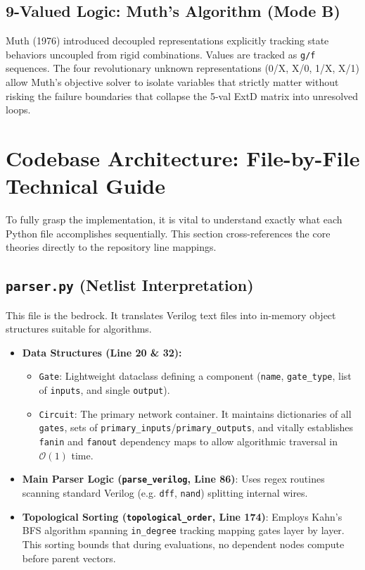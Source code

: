 \documentclass[12pt, a4paper]{article}
\begin{document}
\subsection{9-Valued Logic: Muth's Algorithm (Mode B)}
Muth (1976) introduced decoupled representations explicitly tracking state behaviors uncoupled from rigid combinations. Values are tracked as \texttt{g/f} sequences. The four revolutionary unknown representations (0/X, X/0, 1/X, X/1) allow Muth's objective solver to isolate variables that strictly matter without risking the failure boundaries that collapse the 5-val ExtD matrix into unresolved loops.

\section{Codebase Architecture: File-by-File Technical Guide}

To fully grasp the implementation, it is vital to understand exactly what each Python file accomplishes sequentially. This section cross-references the core theories directly to the repository line mappings.

\subsection{\texttt{parser.py} (Netlist Interpretation)}
This file is the bedrock. It translates Verilog text files into in-memory object structures suitable for algorithms.
\begin{itemize}
    \item \textbf{Data Structures (Line 20 \& 32):} 
        \begin{itemize}
            \item \texttt{Gate}: Lightweight dataclass defining a component (\texttt{name}, \texttt{gate\_type}, list of \texttt{inputs}, and single \texttt{output}). 
            \item \texttt{Circuit}: The primary network container. It maintains dictionaries of all \texttt{gates}, sets of \texttt{primary\_inputs}/\texttt{primary\_outputs}, and vitally establishes \texttt{fanin} and \texttt{fanout} dependency maps to allow algorithmic traversal in $\mathcal{O}(1)$ time.
        \end{itemize}
    \item \textbf{Main Parser Logic (\texttt{parse\_verilog}, Line 86)}: Uses regex routines scanning standard Verilog (e.g. \texttt{dff}, \texttt{nand}) splitting internal wires.
    \item \textbf{Topological Sorting (\texttt{topological\_order}, Line 174)}: Employs Kahn's BFS algorithm spanning \texttt{in\_degree} tracking mapping gates layer by layer. This sorting bounds that during evaluations, no dependent nodes compute before parent vectors. 
\end{itemize}
\end{document}
